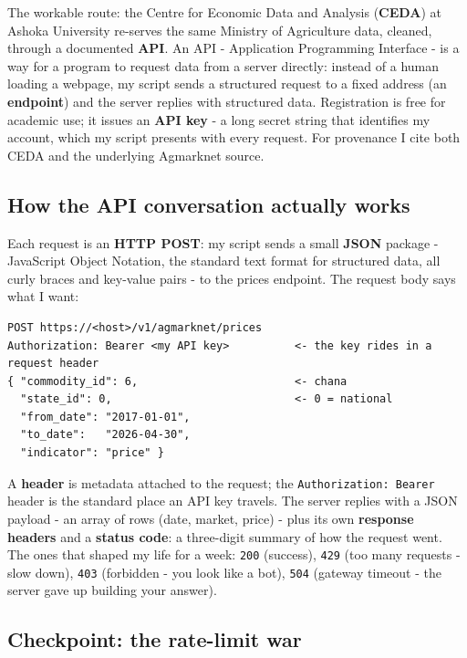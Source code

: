 \documentclass[11pt]{article}
\begin{document}
The workable route: the Centre for Economic Data and Analysis (\textbf{CEDA}) at Ashoka
University re-serves the same Ministry of Agriculture data, cleaned, through a documented
\textbf{API}. An API - Application Programming Interface - is a way for a program to
request data from a server directly: instead of a human loading a webpage, my script sends
a structured request to a fixed address (an \textbf{endpoint}) and the server replies with
structured data. Registration is free for academic use; it issues an \textbf{API key} - a
long secret string that identifies my account, which my script presents with every
request. For provenance I cite both CEDA and the underlying Agmarknet source.

\subsection{How the API conversation actually works}

Each request is an \textbf{HTTP POST}: my script sends a small \textbf{JSON} package -
JavaScript Object Notation, the standard text format for structured data, all curly braces
and key-value pairs - to the prices endpoint. The request body says what I want:

\begin{verbatim}
POST https://<host>/v1/agmarknet/prices
Authorization: Bearer <my API key>          <- the key rides in a request header
{ "commodity_id": 6,                        <- chana
  "state_id": 0,                            <- 0 = national
  "from_date": "2017-01-01",
  "to_date":   "2026-04-30",
  "indicator": "price" }
\end{verbatim}

A \textbf{header} is metadata attached to the request; the \texttt{Authorization: Bearer}
header is the standard place an API key travels. The server replies with a JSON payload -
an array of rows (date, market, price) - plus its own \textbf{response headers} and a
\textbf{status code}: a three-digit summary of how the request went. The ones that shaped
my life for a week: \texttt{200} (success), \texttt{429} (too many requests - slow down),
\texttt{403} (forbidden - you look like a bot), \texttt{504} (gateway timeout - the server
gave up building your answer).

\subsection{Checkpoint: the rate-limit war}
\end{document}

